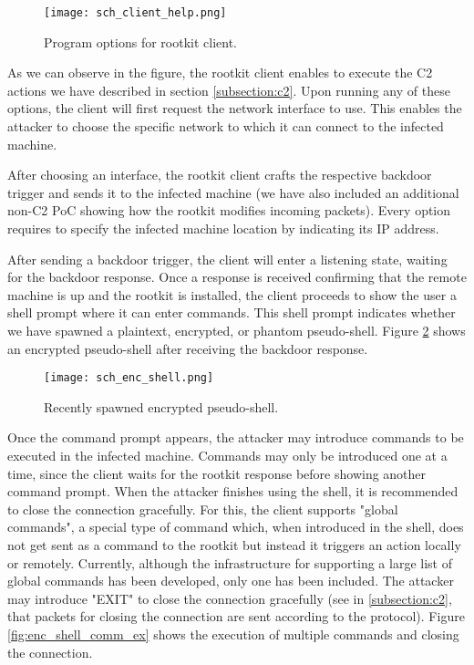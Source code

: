 \begin{figure}[htbp]
	\centering
	\texttt{[image: sch\_client\_help.png]}
	\caption{Program options for rootkit client.}
	\label{fig:client_help}
\end{figure}

As we can observe in the figure, the rootkit client enables to execute the C2 actions we have described in section \ref{subsection:c2}. Upon running any of these options, the client will first request the network interface to use. This enables the attacker to choose the specific network to which it can connect to the infected machine.

After choosing an interface, the rootkit client crafts the respective backdoor trigger and sends it to the infected machine (we have also included an additional non-C2 PoC showing how the rootkit modifies incoming packets). Every option requires to specify the infected machine location by indicating its IP address.

After sending a backdoor trigger, the client will enter a listening state, waiting for the backdoor response. Once a response is received confirming that the remote machine is up and the rootkit is installed, the client proceeds to show the user a shell prompt where it can enter commands. This shell prompt indicates whether we have spawned a plaintext, encrypted, or phantom pseudo-shell. Figure \ref{fig:enc_shell} shows an encrypted pseudo-shell after receiving the backdoor response.

\begin{figure}[htbp]
	\centering
	\texttt{[image: sch\_enc\_shell.png]}
	\caption{Recently spawned encrypted pseudo-shell.}
	\label{fig:enc_shell}
\end{figure}

Once the command prompt appears, the attacker may introduce commands to be executed in the infected machine. Commands may only be introduced one at a time, since the client waits for the rootkit response before showing another command prompt. When the attacker finishes using the shell, it is recommended to close the connection gracefully. For this, the client supports "global commands", a special type of command which, when introduced in the shell, does not get sent as a command to the rootkit but instead it triggers an action locally or remotely. Currently, although the infrastructure for supporting a large list of global commands has been developed, only one has been included. The attacker may introduce "EXIT" to close the connection gracefully (see in \ref{subsection:c2}, that packets for closing the connection are sent according to the protocol). Figure \ref{fig:enc_shell_comm_ex} shows the execution of multiple commands and closing the connection.


